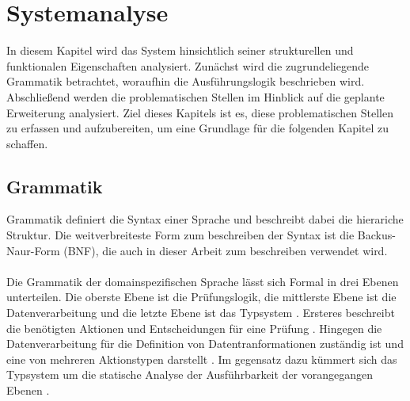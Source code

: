     \chapter{Systemanalyse}
    In diesem Kapitel wird das System hinsichtlich seiner strukturellen und funktionalen Eigenschaften analysiert. 
    Zunächst wird die zugrundeliegende Grammatik betrachtet, woraufhin die Ausführungslogik beschrieben wird. Abschließend werden die problematischen Stellen im Hinblick auf die geplante Erweiterung analysiert.
    Ziel dieses Kapitels ist es, diese problematischen Stellen zu erfassen und aufzubereiten, um eine Grundlage für die folgenden Kapitel zu schaffen.\\
    \section{Grammatik}
    \label{Grammatik}
    Grammatik definiert die Syntax einer Sprache und beschreibt dabei die hierariche Struktur.
    Die weitverbreiteste Form zum beschreiben der Syntax ist die Backus-Naur-Form (BNF), die auch in dieser Arbeit zum beschreiben verwendet wird.\\
    \\
    Die Grammatik der domainspezifischen Sprache lässt sich Formal in drei Ebenen unterteilen. 
    Die oberste Ebene ist die Prüfungslogik, die mittlerste Ebene ist die Datenverarbeitung und die letzte Ebene ist das Typsystem \cite{99}.
    Ersteres beschreibt die benötigten Aktionen und Entscheidungen für eine Prüfung \cite{99}.
    Hingegen die Datenverarbeitung für die Definition von Datentranformationen zuständig ist und eine von mehreren Aktionstypen darstellt \cite{99}.
    Im gegensatz dazu kümmert sich das Typsystem um die statische Analyse der Ausführbarkeit der vorangegangen Ebenen \cite{99}.
